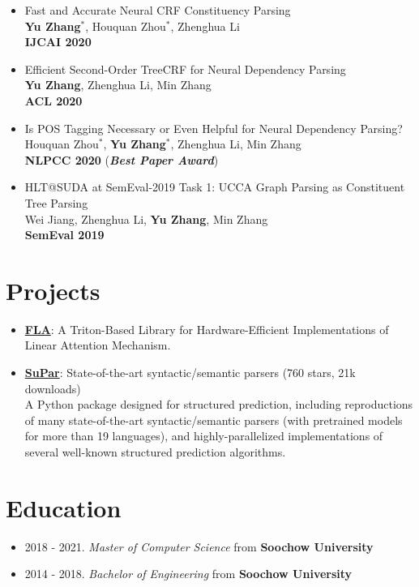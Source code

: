 \documentclass[a4paper,12pt]{article}
\begin{document}
\begin{itemize}[leftmargin=18pt]
\item Fast and Accurate Neural CRF Constituency Parsing\\
    \textbf{Yu Zhang$^*$}, Houquan Zhou$^*$, Zhenghua Li\\
    \textbf{IJCAI 2020}
\item Efficient Second-Order TreeCRF for Neural Dependency Parsing\\
    \textbf{Yu Zhang}, Zhenghua Li, Min Zhang\\
    \textbf{ACL 2020}
\item Is POS Tagging Necessary or Even Helpful for Neural Dependency Parsing?\\
    Houquan Zhou$^*$, \textbf{Yu Zhang$^*$}, Zhenghua Li, Min Zhang\\
    \textbf{NLPCC 2020} (\textbf{\emph{\textcolor{brickred}{Best Paper Award}}})
\item HLT@SUDA at SemEval-2019 Task 1: UCCA Graph Parsing as Constituent Tree Parsing\\
    Wei Jiang, Zhenghua Li, \textbf{Yu Zhang}, Min Zhang\\
    \textbf{SemEval 2019}
\end{itemize}

\section{Projects}
\begin{itemize}[leftmargin=18pt]
\item \href{https://github.com/sustcsonglin/flash-linear-attention}{\textbf{FLA}}: A Triton-Based Library for Hardware-Efficient Implementations of Linear Attention Mechanism.
\item \href{https://github.com/yzhangcs/parser}{\textbf{SuPar}}: State-of-the-art syntactic/semantic parsers (760 stars, 21k downloads)\\
    A Python package designed for structured prediction, including reproductions of many state-of-the-art syntactic/semantic parsers (with pretrained models for more than 19 languages), and highly-parallelized implementations of several well-known structured prediction algorithms.
\end{itemize}

\section{Education}
\begin{itemize}[leftmargin=18pt]
\item 2018 - 2021. \emph{Master of Computer Science} from \textbf{Soochow University} 
\item 2014 - 2018. \emph{Bachelor of Engineering} from \textbf{Soochow University} 
\end{itemize}
\end{document}
